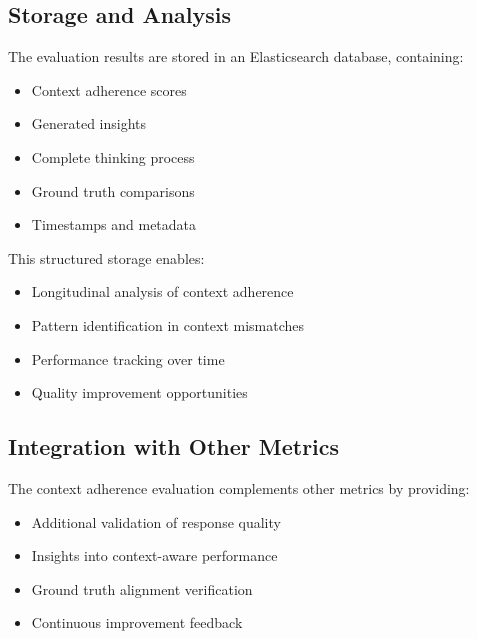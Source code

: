\documentclass[12pt]{article}
\begin{document}
\subsection{Storage and Analysis}

The evaluation results are stored in an Elasticsearch database, containing:

\begin{itemize}
    \item Context adherence scores
    \item Generated insights
    \item Complete thinking process
    \item Ground truth comparisons
    \item Timestamps and metadata
\end{itemize}

This structured storage enables:
\begin{itemize}
    \item Longitudinal analysis of context adherence
    \item Pattern identification in context mismatches
    \item Performance tracking over time
    \item Quality improvement opportunities
\end{itemize}

\subsection{Integration with Other Metrics}

The context adherence evaluation complements other metrics by providing:
\begin{itemize}
    \item Additional validation of response quality
    \item Insights into context-aware performance
    \item Ground truth alignment verification
    \item Continuous improvement feedback
\end{itemize}
\end{document}
